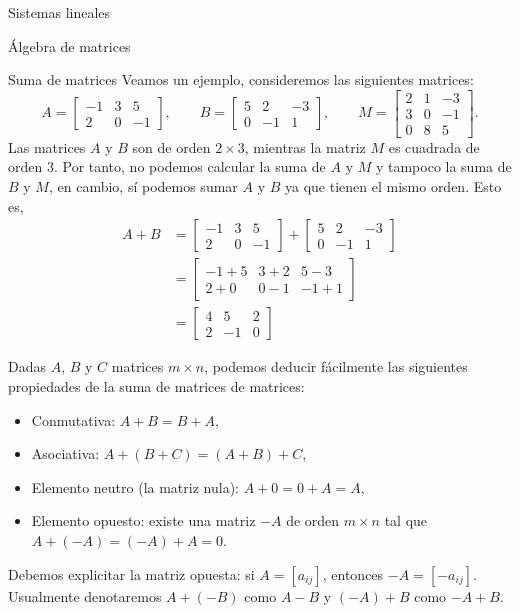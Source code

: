\begin{chapter}{Sistemas lineales}
\begin{section}{\'Algebra de matrices}
\begin{subsection}{Suma  de matrices}
                Veamos un ejemplo, consideremos las siguientes matrices:
                \begin{equation*}
                A = \begin{bmatrix} -1&3&5 \\ 2&0&-1  \end{bmatrix}, \qquad
                B = \begin{bmatrix} 5&2&-3 \\ 0&-1&1  \end{bmatrix}, \qquad
                M = \begin{bmatrix} 2&1&-3 \\ 3&0&-1 \\ 0&8&5 \end{bmatrix}.
                \end{equation*}
                Las matrices $A$ y $B$ son de orden $2 \times 3$, mientras la matriz $M$ es cuadrada de orden 3. Por tanto, no podemos calcular la suma de $A$ y $M$ y tampoco la suma de $B$ y $M$, en cambio, sí podemos sumar $A$ y $B$ ya que tienen el mismo orden. Esto es,
                \begin{align*}
                A + B &= \begin{bmatrix} -1&3&5 \\ 2&0&-1  \end{bmatrix}+ \begin{bmatrix} 5&2&-3 \\ 0&-1&1  \end{bmatrix} \\
                &=  \begin{bmatrix} -1+5&3+2&5-3 \\ 2+0&0-1&-1+1  \end{bmatrix} \\
                &=  \begin{bmatrix} 4&5&2 \\ 2&-1&0  \end{bmatrix}
                \end{align*}
                
                
                Dadas $A$, $B$ y $C$ matrices $m \times n$, podemos deducir fácilmente las siguientes propiedades de la suma de matrices de matrices:
                \begin{itemize}
                    \item Conmutativa: $A + B = B + A$,
                    \item Asociativa: $A + (B + C) = (A + B) + C$,
                    \item Elemento neutro (la matriz nula): $A + 0 = 0 + A = A$,
                    \item Elemento opuesto: existe una matriz $-A$ de orden $m \times n$ tal que  $A + (-A) = (-A) + A = 0$.
                \end{itemize}
                Debemos explicitar la matriz opuesta: si $A = [a_{ij}]$,  entonces $-A = [-a_{ij}]$. Usualmente denotaremos $A + (-B)$ como $A-B$ y $(-A)+B$ como $-A+B$. 
                

\end{subsection}
\end{section}
\end{chapter}
